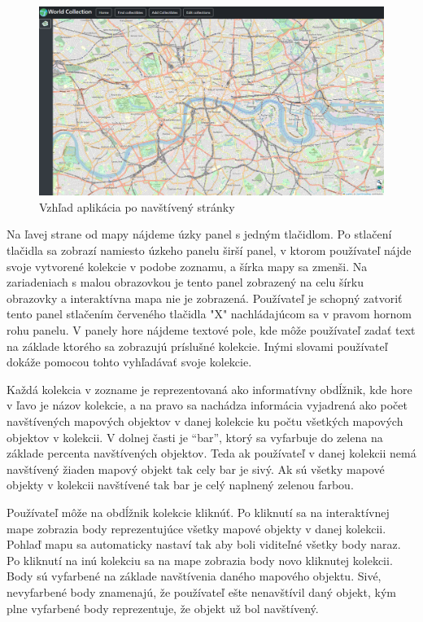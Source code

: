 \begin{figure}[h]
      \includegraphics[width=140mm]{../img/ud-prazdna_mapa}
      \centering
      \caption{Vzhľad aplikácia po navštívený stránky}
\end{figure}

Na ľavej strane od mapy nájdeme úzky panel s jedným tlačidlom. Po stlačení tlačidla sa zobrazí namiesto úzkeho panelu širší panel, v ktorom používateľ nájde svoje vytvorené
kolekcie v podobe zoznamu, a šírka mapy sa zmenši. Na zariadeniach s malou obrazovkou je tento panel zobrazený na celu šírku obrazovky a interaktívna mapa nie je zobrazená.
Používateľ je schopný zatvoriť tento panel stlačením červeného tlačidla "X" nachládajúcom sa v pravom hornom rohu panelu. V panely hore nájdeme textové pole, kde môže používateľ
zadať text na základe ktorého sa zobrazujú príslušné kolekcie. Inými slovami používateľ dokáže pomocou tohto vyhľadávať svoje kolekcie.

Každá kolekcia v zozname je reprezentovaná ako informatívny obdĺžnik, kde hore v ľavo je názov kolekcie, a na pravo sa nachádza informácia vyjadrená ako počet navštívených mapových objektov v danej kolekcie ku
počtu všetkých mapových objektov v kolekcii. V dolnej časti je “bar”, ktorý sa vyfarbuje do zelena na základe percenta navštívených objektov. Teda ak používateľ v danej kolekcii nemá navštívený
žiaden mapový objekt tak cely bar je sivý. Ak sú všetky mapové objekty v kolekcii navštívené tak bar je celý naplnený zelenou farbou.

Používateľ môže na obdĺžnik kolekcie kliknúť. Po kliknutí sa na interaktívnej mape zobrazia body reprezentujúce všetky mapové objekty v danej kolekcii.
Pohlaď  mapu sa automaticky nastaví tak aby boli viditeľné všetky body naraz. Po kliknutí na inú kolekciu sa na mape zobrazia body novo kliknutej kolekcii.
Body sú vyfarbené na základe navštívenia daného mapového objektu. Sivé, nevyfarbené body znamenajú, že používateľ ešte nenavštívil daný objekt, kým plne vyfarbené
body reprezentuje, že objekt už bol navštívený.

